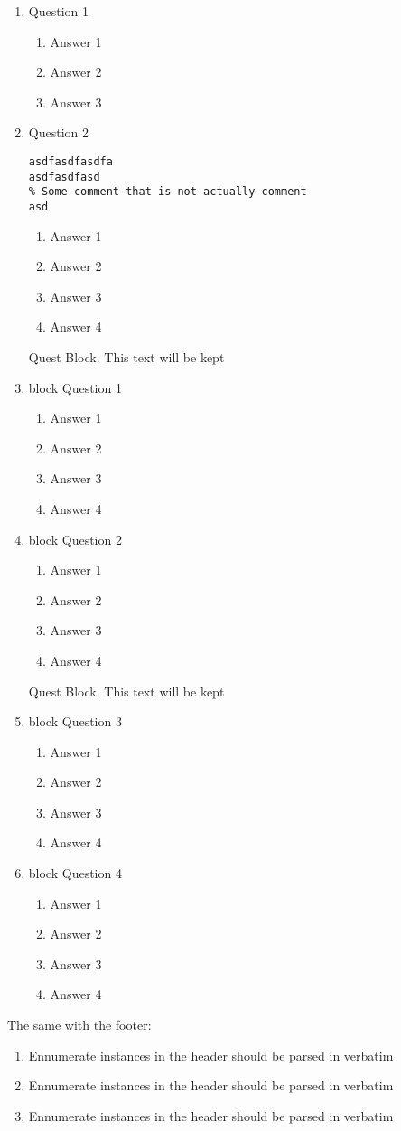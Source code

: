 \documentclass{article}
\begin{document}
\begin{enumerate}
\item Question 1
\begin{enumerate}
\item Answer 1
    \item Answer 2 %
    \item Answer 3 %
\end{enumerate}
\item Question 2 %
\begin{verbatim} 
asdfasdfasdfa
asdfasdfasd
% Some comment that is not actually comment
asd
\end{verbatim}

\begin{enumerate}
    \item Answer 1
    \item Answer 2
    \item Answer 3
    \item Answer 4
\end{enumerate}

	Quest Block. This text will be kept
	\item block Question 1
	\begin{enumerate}
		\item Answer 1
		\item Answer 2
		\item Answer 3
		\item Answer 4
	\end{enumerate}
	\item block Question 2
	\begin{enumerate}
		\item Answer 1
		\item Answer 2
		\item Answer 3
		\item Answer 4
	\end{enumerate}

	Quest Block. This text will be kept
	\item block Question 3
	\begin{enumerate}
		\item Answer 1
		\item Answer 2
		\item Answer 3
		\item Answer 4
	\end{enumerate}
	\item block Question 4
	\begin{enumerate}
		\item Answer 1
		\item Answer 2
		\item Answer 3
		\item Answer 4
	\end{enumerate}


\end{enumerate}
The same with the footer:
\begin{enumerate}
	\item Ennumerate instances in the header should be parsed in verbatim
	\item Ennumerate instances in the header should be parsed in verbatim
	\item Ennumerate instances in the header should be parsed in verbatim
\end{enumerate}
\end{document}
